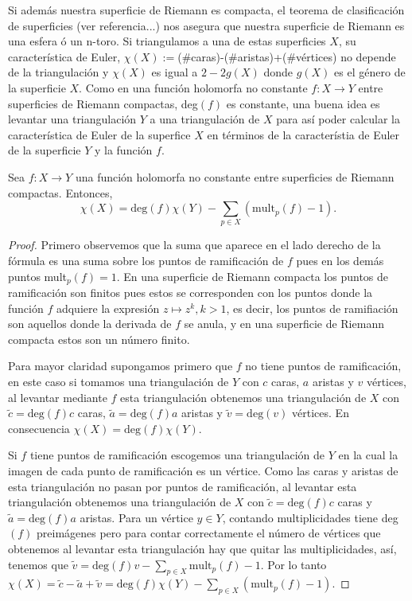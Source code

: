 Si además nuestra superficie de Riemann es compacta, el teorema de clasificación de superficies (ver referencia...) nos asegura que nuestra superficie de Riemann es una esfera ó un n-toro. Si triangulamos a una de estas superficies $X$, su característica de Euler, $\chi(X):=$(\#caras)-(\#aristas)+(\#vértices) no depende de la triangulación y $\chi(X)$ es igual a $2-2g(X)$ donde $g(X)$ es el género de la superficie $X$. Como en una función holomorfa no constante $f\colon X\rightarrow Y$ entre superficies de Riemann compactas, deg$(f)$ es constante, una buena idea es levantar una triangulación $Y$ a una triangulación de $X$ para así poder calcular la característica de Euler de la superfice $X$ en términos de la característia de Euler de la superficie $Y$ y la función $f$.

\begin{Teorema}
\label{Teo:FormulaDeRiemannHurwitz}
Sea $f\colon X\rightarrow Y$ una función holomorfa no constante entre superficies de Riemann compactas. Entonces,
\begin{equation*}
\chi(X)=\mathrm{deg}(f)\chi(Y)-\sum_{p\in X}(\mathrm{mult}_{p}(f)-1).
\end{equation*}
\end{Teorema}
\begin{proof}
Primero observemos que la suma que aparece en el lado derecho de la fórmula es una suma sobre los puntos de ramificación de $f$ pues en los demás puntos mult$_{p}(f)=1$. En una superficie de Riemann compacta los puntos de ramificación son finitos pues estos se corresponden con los puntos donde la función $f$ adquiere la expresión $z\mapsto z^{k}, k>1$, es decir, los puntos de ramifiación son aquellos donde la derivada de $f$ se anula, y en una superficie de Riemann compacta estos son un número finito.

Para mayor claridad supongamos primero que $f$ no tiene puntos de ramificación, en este caso si tomamos una triangulación de $Y$ con $c$ caras, $a$ aristas y $v$ vértices, al levantar mediante $f$ esta triangulación obtenemos una triangulación de $X$ con $\tilde{c}=\mathrm{deg}(f)c$ caras, $\tilde{a}=\mathrm{deg}(f)a$ aristas y $\tilde{v}=\mathrm{deg}(v)$ vértices. En consecuencia $\chi(X)=\mathrm{deg}(f)\chi(Y)$.

Si $f$ tiene puntos de ramificación escogemos una triangulación de $Y$ en la cual la imagen de cada punto de ramificación es un vértice. Como las caras y aristas de esta triangulación no pasan por puntos de ramificación, al levantar esta triangulación obtenemos una triangulación de $X$ con $\tilde{c}=\mathrm{deg}(f)c$ caras y $\tilde{a}=\mathrm{deg}(f)a$ aristas. Para un vértice $y\in Y$, contando multiplicidades tiene deg$(f)$ preimágenes pero para contar correctamente el número de vértices que obtenemos al levantar esta triangulación hay que quitar las multiplicidades, así, tenemos que $\tilde{v}=\mathrm{deg}(f)v-\sum_{p\in X}\mathrm{mult}_{p}(f)-1$. Por lo tanto $\chi(X)=\tilde{c}-\tilde{a}+\tilde{v}=\mathrm{deg}(f)\chi(Y)-\sum_{p\in X}(\mathrm{mult}_{p}(f)-1)$.
\end{proof}


